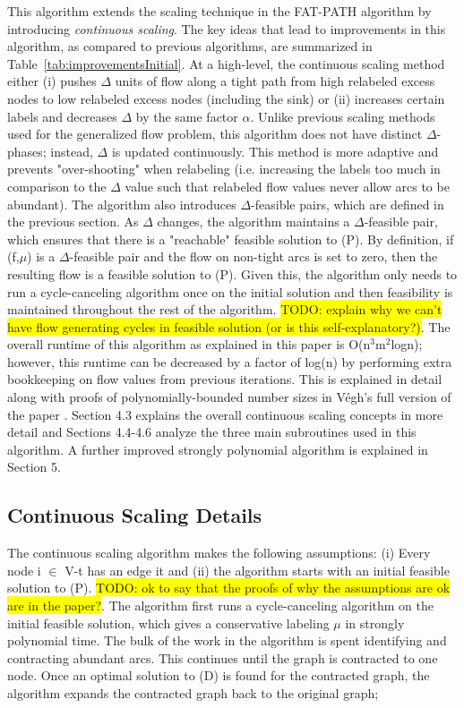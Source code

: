 \documentclass[11pt]{article}
\theoremstyle{definition}
\theoremstyle{definition}
\newcommand{\todo}[1]{\colorbox{yellow}{TODO: #1}}
\begin{document}
This algorithm extends the scaling technique in the FAT-PATH algorithm \cite{Goldberg:1991:CAG:105014.105022} by introducing \textit{continuous scaling}. The key ideas that lead to improvements in this algorithm, as compared to previous algorithms, are summarized in Table~\ref{tab:improvementsInitial}. At a high-level, the continuous scaling method either (i) pushes $\Delta$ units of flow along a tight path from high relabeled excess nodes to low relabeled excess nodes (including the sink) or (ii) increases certain labels and decreases $\Delta$ by the same factor $\alpha$. Unlike previous scaling methods used for the generalized flow problem, this algorithm does not have distinct $\Delta$-phases; instead, $\Delta$ is updated continuously. This method is more adaptive and prevents "over-shooting" when relabeling (i.e. increasing the labels too much in comparison to the $\Delta$ value such that relabeled flow values never allow arcs to be abundant). The algorithm also introduces $\Delta$-feasible pairs, which are defined in the previous section. As $\Delta$ changes, the algorithm maintains a $\Delta$-feasible pair, which ensures that there is a "reachable" feasible solution to (P). By definition, if (f,$\mu$) is a $\Delta$-feasible pair and the flow on non-tight arcs is set to zero, then the resulting flow is a feasible solution to (P). Given this, the algorithm only needs to run a cycle-canceling algorithm once on the initial solution and then feasibility is maintained throughout the rest of the algorithm. \todo{explain why we can't have flow generating cycles in feasible solution (or is this self-explanatory?)}. The overall runtime of this algorithm as explained in this paper is O(n$^3$m$^2$logn); however, this runtime can be decreased by a factor of log(n) by performing extra bookkeeping on flow values from previous iterations. This is explained in detail along with proofs of polynomially-bounded number sizes in Végh's full version of the paper \cite{article}. Section 4.3 explains the overall continuous scaling concepts in more detail and Sections 4.4-4.6 analyze the three main subroutines used in this algorithm. A further improved strongly polynomial algorithm is explained in Section 5. 
\subsection{Continuous Scaling Details}
The continuous scaling algorithm makes the following assumptions: (i) Every node i $\in$ V-t has an edge it and (ii) the algorithm starts with an initial feasible solution to (P). \todo{ok to say that the proofs of why the assumptions are ok are in the paper?}. The algorithm first runs a cycle-canceling algorithm on the initial feasible solution, which gives a conservative labeling $\mu$ in strongly polynomial time. The bulk of the work in the algorithm is spent identifying and contracting abundant arcs. This continues until the graph is contracted to one node. Once an optimal solution to (D) is found for the contracted graph, the algorithm expands the contracted graph back to the original graph; 
 
\end{document}
